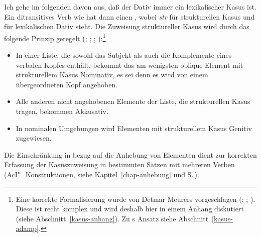 Ich gehe im folgenden davon aus, daß der Dativ immer ein lexikalischer Kasus ist. 
Ein ditransitives Verb wie  hat dann einen \subcatw {},
wobei \textit{str} für strukturellen Kasus und  für lexikalischen Dativ steht.
Die Zuweisung struktureller Kasus wird durch das folgende Prinzip geregelt (\citealp{Prze99}; 
\citealp{Meurers99b}; \citealp[Kapitel~10.4.1.4]{Meurers2000b}; \citealp{MdK2001a}):\footnote{
  Eine korrekte Formalisierung wurde von Detmar Meurers
  vorgeschlagen (\citealp{Meurers99b}; \citealp{MdK2001a}; \citealp[Kapitel~10.4.1.4]{Meurers2000b}).
  Diese ist recht komplex und wird deshalb hier in einem Anhang diskutiert (siehe Abschnitt~\ref{kasus-anhang}).
  Zu \prz{}s Ansatz siehe Abschnitt~\ref{kasus-adamp}.%
}
\begin{prinzip-break}[Kasusprinzip]
\label{case-p}
\begin{itemize}
\item In einer Liste, die sowohl das Subjekt als auch die Komplemente eines verbalen Kopfes
      enthält, bekommt das am wenigsten oblique Element mit strukturellem Kasus 
      Nominativ, es sei denn es wird von einem übergeordneten Kopf angehoben.
\item Alle anderen nicht angehobenen Elemente der Liste, die strukturellen Kasus tragen, bekommen Akkusativ.
\item In nominalen Umgebungen wird Elementen mit strukturellem Kasus Genitiv zugewiesen.
\end{itemize}
\end{prinzip-break}
Die Einschränkung in bezug auf die Anhebung von Elementen dient zur korrekten Erfassung der
Kasuszuweisung in bestimmten Sätzen mit mehreren Verben (\zb AcI"=Konstruktionen, siehe
Kapitel~\ref{chap-anhebung} und S.\,\pageref{page-aci-kasus}).

